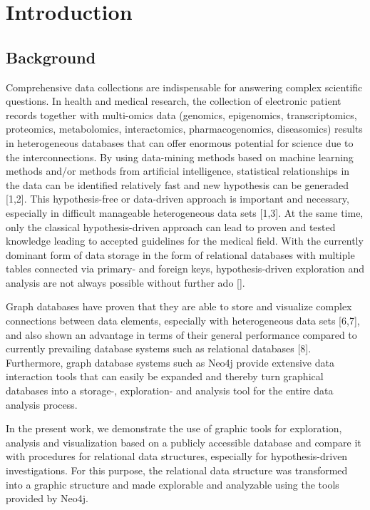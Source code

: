\documentclass[aac]{iosart2x}
\begin{document}

\section{Introduction}\label{s1}

\subsection{Background}\label{s1.1}
Comprehensive data collections are indispensable for answering complex scientific questions. In health and medical research, the collection of electronic patient records together with multi-omics data (genomics, epigenomics, transcriptomics, proteomics, metabolomics, interactomics, pharmacogenomics, diseasomics) results in heterogeneous databases that can offer enormous potential for science due to the interconnections. By using data-mining methods based on machine learning methods and/or methods from artificial intelligence, statistical relationships in the data can be identified relatively fast and new hypothesis can be generaded [1,2]. This hypothesis-free or data-driven approach is important and necessary, especially in difficult manageable heterogeneous data sets [1,3]. At the same time, only the classical hypothesis-driven approach can lead to proven and tested knowledge leading to accepted guidelines for the medical field. With the currently dominant form of data storage in the form of relational databases with multiple tables connected via primary- and foreign keys, hypothesis-driven exploration and analysis are not always possible without further ado [].

Graph databases have proven that they are able to store and visualize complex connections between data elements, especially with heterogeneous data sets [6,7], and also shown an advantage in terms of their general performance compared to currently prevailing database systems such as relational databases [8]. Furthermore, graph database systems such as Neo4j provide extensive data interaction tools that can easily be expanded and thereby turn graphical databases into a storage-, exploration- and analysis tool for the entire data analysis process.

In the present work, we demonstrate the use of graphic tools for exploration, analysis and visualization based on a publicly accessible database and compare it with procedures for relational data structures, especially for hypothesis-driven investigations. For this purpose, the relational data structure was transformed into a graphic structure and made explorable and analyzable using the tools provided by Neo4j. 
\end{document}
